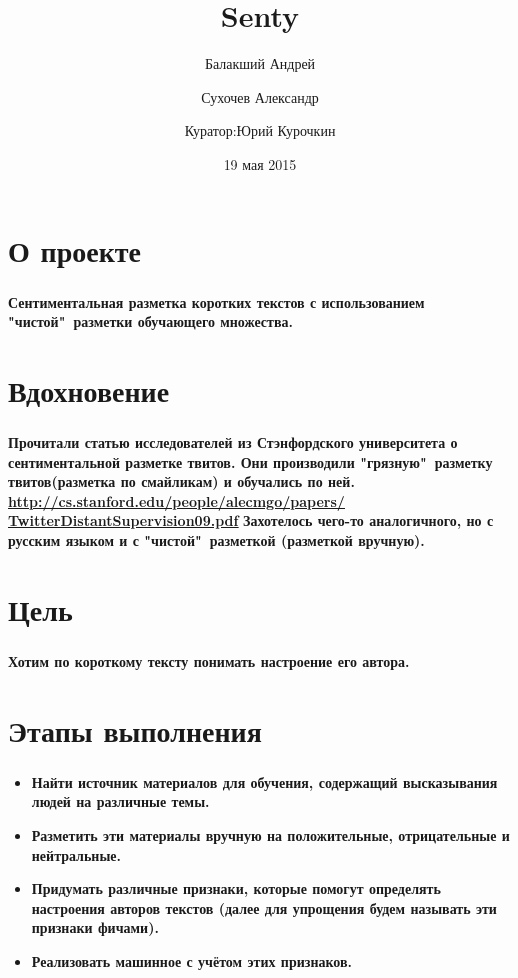 \documentclass[t]{beamer}
\title{Senty}
\author{Балакший Андрей \and Сухочев Александр 
	\and \newline Куратор:Юрий Курочкин}
\date{19 мая 2015}
\institute[Computer Science Center]
\begin{document}
	\frame[plain]{\titlepage}
	
	
	\section{О проекте}
	\begin{frame}
		\frametitle{\insertsection}
		\textbf{Сентиментальная разметка коротких текстов с использованием "чистой"\ разметки обучающего множества.}
	\end{frame}
	
	
	\section{Вдохновение}
	\begin{frame}
		\frametitle{\insertsection}
		\textbf{Прочитали статью исследователей из Стэнфордского университета о сентиментальной разметке твитов. Они производили "грязную"\ разметку твитов(разметка по смайликам) и обучались по ней. \newline \newline}
        \hyperref[http://cs.stanford.edu/people/alecmgo/papers/TwitterDistantSupervision09.pdf]{\textbf{\underline{http://cs.stanford.edu/people/alecmgo/papers/} \newline \underline{TwitterDistantSupervision09.pdf}}} \pause
		\newline
        \newline
		\textbf{Захотелось чего-то аналогичного, но с русским языком и с "чистой"\ разметкой (разметкой вручную).}
	\end{frame}
	
	
	\section{Цель}
	\begin{frame}
		\frametitle{\insertsection}
		\textbf{Хотим по короткому тексту понимать настроение его автора.}
	\end{frame}
	
	
	\section{Этапы выполнения}
	\begin{frame}
    	
		\frametitle{\insertsection}
		\begin{itemize}
			\item \textbf{Найти источник материалов для обучения, содержащий высказывания людей на различные темы.}	
            \item \textbf{Разметить эти материалы вручную на положительные, отрицательные и нейтральные.}
			\item \textbf{Придумать различные признаки, которые помогут определять настроения авторов текстов (далее для упрощения будем называть эти признаки фичами).}
            \item \textbf{Реализовать машинное с учётом этих признаков.} 
		\end{itemize}
	\end{frame}
	
\end{document}
